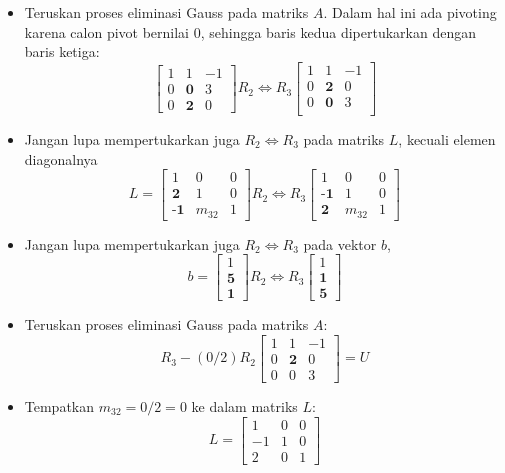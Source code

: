 \documentclass[pdflatex,compress,mathserif]{beamer}
\begin{document}
\begin{frame}
	\begin{itemize}
		\item Teruskan proses eliminasi Gauss pada matriks $ A $. Dalam hal ini ada pivoting karena calon pivot bernilai $ 0 $, sehingga baris kedua dipertukarkan dengan baris ketiga:
		\[ \begin{bmatrix}
			1 & 1 & -1 \\
			0 & \textbf{0} & 3 \\
			0 & \textbf{2} & 0
		\end{bmatrix} R_2 \Leftrightarrow R_3
		\begin{bmatrix}
			1 & 1 & -1 \\
			0 & \textbf{2} & 0 \\
			0 & \textbf{0} & 3 \\
		\end{bmatrix}\]
		\item Jangan lupa mempertukarkan juga $ R_2 \Leftrightarrow R_3 $ pada matriks $ L $, kecuali elemen diagonalnya
		\[
		L = \begin{bmatrix}
			1 & 0 & 0 \\
			\textbf{2} & 1 & 0 \\
			\textbf{-1} & m_{32} & 1
		\end{bmatrix}
		R_2 \Leftrightarrow R_3
		\begin{bmatrix}
			1 & 0 & 0 \\
			\textbf{-1} & 1 & 0 \\
			\textbf{2} & m_{32} & 1
		\end{bmatrix}
		\]
	\end{itemize}
\end{frame}

\begin{frame}
	\begin{itemize}
		\item Jangan lupa mempertukarkan juga $ R_2 \Leftrightarrow R_3 $ pada vektor $ b $,
		\[ b = \begin{bmatrix}
		1 \\ \textbf{5} \\ \textbf{1}
		\end{bmatrix} R_2 \Leftrightarrow R_3
		 \begin{bmatrix}
		1 \\ \textbf{1} \\ \textbf{5}
		\end{bmatrix}
		\]
		\item Teruskan proses eliminasi Gauss pada matriks $ A $:
		\[ R_3 - (0/2)R_2 \begin{bmatrix}
			1 & 1 & -1 \\
			0 & \textbf{2} & 0 \\
			0 & 0 & 3
		\end{bmatrix} = U \]
		\item Tempatkan $ m_{32} = 0/2 = 0 $ ke dalam matriks $ L $:
		\[ L = \begin{bmatrix}
			1 & 0 & 0 \\
			-1 & 1 & 0 \\
			2 & 0 & 1
		\end{bmatrix}\]
	\end{itemize}
\end{frame}
\end{document}
